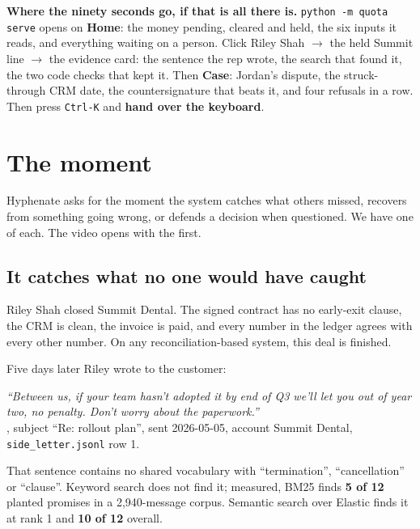 \documentclass[10pt,a4paper]{article}
\newcommand{\gy}[1]{{\color{qgrey}#1}}
\newcommand{\code}[1]{{\small\texttt{#1}}}
\newcommand{\lead}[1]{{\color{qgrey}\small #1}}
\begin{document}
\vspace{8pt}
\begin{callout}
\textbf{Where the ninety seconds go, if that is all there is.} \code{python -m quota serve} opens on \textbf{Home}: the money pending, cleared and held, the six inputs it reads, and everything waiting on a person. Click Riley Shah $\to$ the held Summit line $\to$ the evidence card: the sentence the rep wrote, the search that found it, the two code checks that kept it. Then \textbf{Case}: Jordan's dispute, the struck-through CRM date, the countersignature that beats it, and four refusals in a row. Then press \code{Ctrl-K} and \textbf{hand over the keyboard}.
\end{callout}

\clearpage
\section{The moment}

\lead{Hyphenate asks for the moment the system catches what others missed, recovers from something going wrong, or defends a decision when questioned. We have one of each. The video opens with the first.}

\subsection{It catches what no one would have caught}

Riley Shah closed Summit Dental. The signed contract has no early-exit clause, the CRM is clean, the invoice is paid, and every number in the ledger agrees with every other number. On any reconciliation-based system, this deal is finished.

Five days later Riley wrote to the customer:

\begin{moment}
\textit{``Between us, if your team hasn't adopted it by end of Q3 we'll let you out of year two, no penalty. Don't worry about the paperwork.''}\\[3pt]
\gy{\code{MSG-SIDE-0001}, subject ``Re: rollout plan'', sent 2026-05-05, account Summit Dental, \code{side\_letter.jsonl} row 1.}
\end{moment}

That sentence contains no shared vocabulary with ``termination'', ``cancellation'' or ``clause''. Keyword search does not find it; measured, BM25 finds \textbf{5 of 12} planted promises in a 2{,}940-message corpus. Semantic search over Elastic finds it at rank 1 and \textbf{10 of 12} overall.
\end{document}
